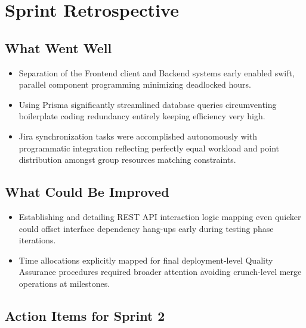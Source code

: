 \documentclass[12pt,a4paper]{article}
\begin{document}
\section{Sprint Retrospective}

\subsection{What Went Well}

\begin{itemize}[leftmargin=1.5em, itemsep=4pt]
  \item Separation of the Frontend client and Backend systems early enabled swift, parallel component programming minimizing deadlocked hours.
  \item Using Prisma significantly streamlined database queries circumventing boilerplate coding redundancy entirely keeping efficiency very high.
  \item Jira synchronization tasks were accomplished autonomously with programmatic integration reflecting perfectly equal workload and point distribution amongst group resources matching constraints.
\end{itemize}

\subsection{What Could Be Improved}

\begin{itemize}[leftmargin=1.5em, itemsep=4pt]
  \item Establishing and detailing REST API interaction logic mapping even quicker could offset interface dependency hang-ups early during testing phase iterations.
  \item Time allocations explicitly mapped for final deployment-level Quality Assurance procedures required broader attention avoiding crunch-level merge operations at milestones.
\end{itemize}

\subsection{Action Items for Sprint 2}
\end{document}
